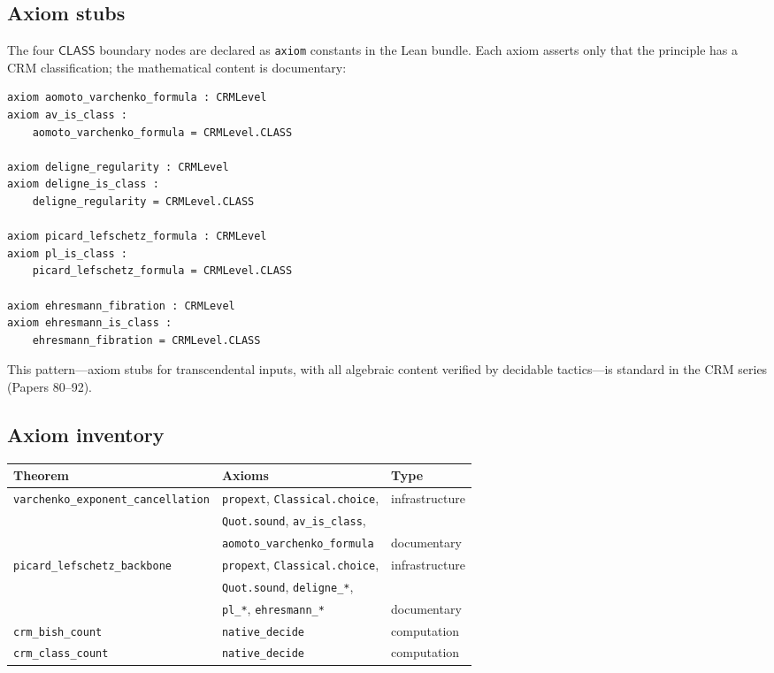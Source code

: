 \documentclass[11pt]{article}
\theoremstyle{plain}
\theoremstyle{definition}
\theoremstyle{remark}
\newcommand{\CLASS}{\mathsf{CLASS}}
\begin{document}
\subsection{Axiom stubs}

The four $\CLASS$ boundary nodes are declared as \texttt{axiom} constants
in the Lean bundle.  Each axiom asserts only that the principle has a
CRM classification; the mathematical content is documentary:

{\small
\begin{verbatim}
axiom aomoto_varchenko_formula : CRMLevel
axiom av_is_class :
    aomoto_varchenko_formula = CRMLevel.CLASS

axiom deligne_regularity : CRMLevel
axiom deligne_is_class :
    deligne_regularity = CRMLevel.CLASS

axiom picard_lefschetz_formula : CRMLevel
axiom pl_is_class :
    picard_lefschetz_formula = CRMLevel.CLASS

axiom ehresmann_fibration : CRMLevel
axiom ehresmann_is_class :
    ehresmann_fibration = CRMLevel.CLASS
\end{verbatim}
}

\noindent
This pattern---axiom stubs for transcendental inputs, with all algebraic
content verified by decidable tactics---is standard in the CRM series
(Papers 80--92).

\subsection{Axiom inventory}

\begin{center}
\begin{tabular}{lll}
\toprule
\textbf{Theorem} & \textbf{Axioms} & \textbf{Type} \\
\midrule
\texttt{varchenko\_exponent\_cancellation} &
  \texttt{propext}, \texttt{Classical.choice}, & infrastructure \\
  & \texttt{Quot.sound}, \texttt{av\_is\_class}, & \\
  & \texttt{aomoto\_varchenko\_formula} & documentary \\
\midrule
\texttt{picard\_lefschetz\_backbone} &
  \texttt{propext}, \texttt{Classical.choice}, & infrastructure \\
  & \texttt{Quot.sound}, \texttt{deligne\_*}, & \\
  & \texttt{pl\_*}, \texttt{ehresmann\_*} & documentary \\
\midrule
\texttt{crm\_bish\_count} & \texttt{native\_decide} & computation \\
\texttt{crm\_class\_count} & \texttt{native\_decide} & computation \\
\bottomrule
\end{tabular}
\end{center}
\end{document}
